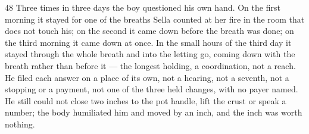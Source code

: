 \begin{CRchronicle}{48}
Three times in three days the boy questioned his own hand. On the first morning it stayed for one of the breaths Sella counted at her fire in the room that does not touch his; on the second it came down before the breath was done; on the third morning it came down at once. In the small hours of the third day it stayed through the whole breath and into the letting go, coming down with the breath rather than before it --- the longest holding, a coordination, not a reach. He filed each answer on a place of its own, not a hearing, not a seventh, not a stopping or a payment, not one of the three held changes, with no payer named. He still could not close two inches to the pot handle, lift the crust or speak a number; the body humiliated him and moved by an inch, and the inch was worth nothing.
\end{CRchronicle}
